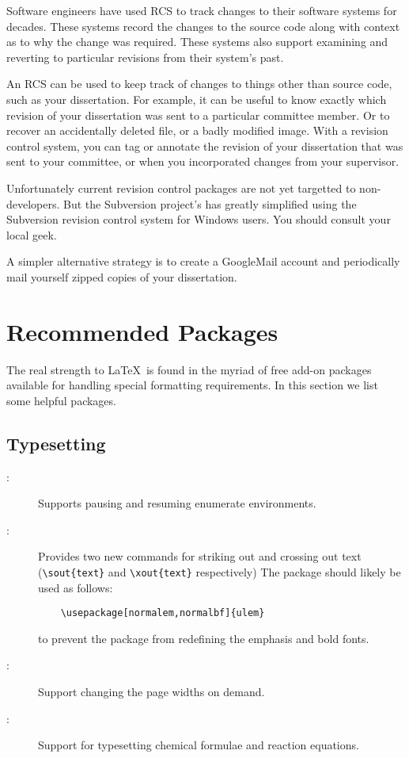 Software engineers have used \acf{RCS} to track changes to their
software systems for decades.  These systems record the changes to
the source code along with context as to why the change was required.
These systems also support examining and reverting to particular
revisions from their system's past.

An \ac{RCS} can be used to keep track of changes to things other
than source code, such as your dissertation.  For example, it can
be useful to know exactly which revision of your dissertation was
sent to a particular committee member.  Or to recover an accidentally
deleted file, or a badly modified image.  With a revision control
system, you can tag or annotate the revision of your dissertation
that was sent to your committee, or when you incorporated changes
from your supervisor.

Unfortunately current revision control packages are not yet targetted
to non-developers.  But the Subversion project's
has greatly simplified using the Subversion revision control system
for Windows users.  You should consult your local geek.

A simpler alternative strategy is to create a GoogleMail account
and periodically mail yourself zipped copies of your dissertation.

\section{Recommended Packages}

The real strength to \LaTeX\ is found in the myriad of free add-on
packages available for handling special formatting requirements.
In this section we list some helpful packages.

\subsection{Typesetting}

\begin{description}
\item[:]
    Supports pausing and resuming enumerate environments.

\item[:]
    Provides two new commands for striking out and crossing out text
    (\verb+\sout{text}+ and \verb+\xout{text}+ respectively)
    The package should likely
    be used as follows:
    \begin{verbatim}
    \usepackage[normalem,normalbf]{ulem}
    \end{verbatim}
    to prevent the package from redefining the emphasis and bold fonts.

\item[:]
    Support changing the page widths on demand.

\item[:] 
    Support for typesetting chemical formulae and reaction equations.

\end{description}

